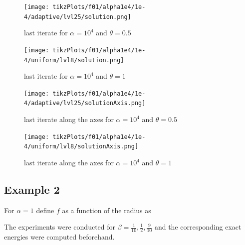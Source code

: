 \documentclass[draft=false,twoside,12pt]{scrreprt}
\begin{document}
\begin{minipage}[t]{0.45\textwidth}
  \begin{figure}[H]
	  \centering
		\texttt{[image: tikzPlots/f01/alpha1e4/1e-4/adaptive/lvl25/solution.png]} 
    \caption{last iterate for $\alpha=10^4$ and $\theta = 0.5$}
  \end{figure}
\end{minipage}
\hfill
\vline
\hfill
\begin{minipage}[t]{0.45\textwidth}
  \begin{figure}[H]
	  \centering
		\texttt{[image: tikzPlots/f01/alpha1e4/1e-4/uniform/lvl8/solution.png]} 
    \caption{last iterate for $\alpha=10^4$ and $\theta = 1$}
  \end{figure}
\end{minipage}

\vspace{-\parskip}
\begin{minipage}[t]{0.45\textwidth}
  \begin{figure}[H]
	  \centering
		\texttt{[image: tikzPlots/f01/alpha1e4/1e-4/adaptive/lvl25/solutionAxis.png]} 
    \caption{last iterate along the axes for $\alpha=10^4$ and $\theta = 0.5$}
  \end{figure}
\end{minipage}
\hfill
\vline
\hfill
\begin{minipage}[t]{0.45\textwidth}
  \begin{figure}[H]
	  \centering
		\texttt{[image: tikzPlots/f01/alpha1e4/1e-4/uniform/lvl8/solutionAxis.png]} 
    \caption{last iterate along the axes for $\alpha=10^4$ and $\theta = 1$}
  \end{figure}
\end{minipage}
\subsection{Example 2}
For $\alpha=1$ define $f$ as a function of the radius as

The experiments were conducted for $\beta = \frac{1}{10}, \frac{1}{2},
\frac{9}{10}$ and the corresponding exact energies were computed beforehand.
\end{document}

